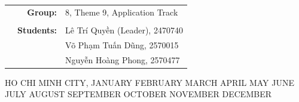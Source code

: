 \documentclass[a4paper,11pt]{article}
\newcommand{\EnglishMonth}{%
    \ifcase\month
    \or January%
    \or February%
    \or March%
    \or April%
    \or May%
    \or June%
    \or July%
    \or August%
    \or September%
    \or October%
    \or November%
    \or December%
    \fi
}
\begin{document}
\begin{titlepage}
\begin{table}[h]
\begin{tabular}{rrl}
    & \textbf{Group:} &
    8, Theme 9, Application Track \\

    \\[3pt]

    & \textbf{Students:} &
    Lê Trí Quyền (Leader), 2470740 \\

    & &
    Võ Phạm Tuấn Dũng, 2570015 \\

    & &
    Nguyễn Hoàng Phong, 2570477 \\



\end{tabular}
\end{table}

\vfill

\begin{center}
    {\footnotesize
    HO CHI MINH CITY, \MakeUppercase{\EnglishMonth} \the\year
    }
\end{center}

\end{titlepage}

\clearpage
\hypersetup{pageanchor=true}



\clearpage

\printbibliography[
    title={References},
    heading=bibintoc
]
\thispagestyle{fancy}
\end{document}

